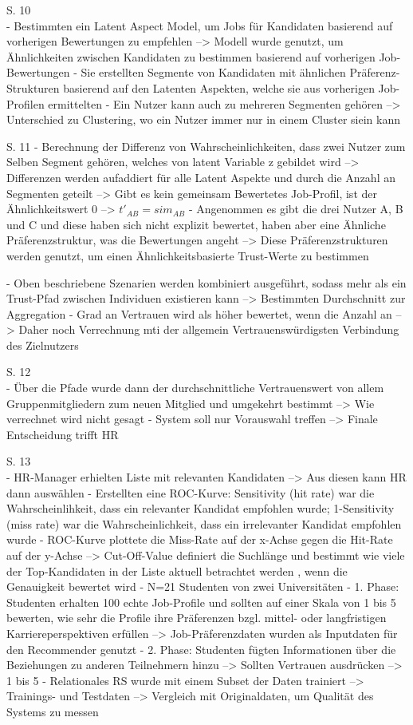 S. 10\\
- Bestimmten ein Latent Aspect Model, um Jobs für Kandidaten basierend auf vorherigen Bewertungen zu empfehlen --> Modell wurde genutzt, um Ähnlichkeiten zwischen Kandidaten zu bestimmen basierend auf vorherigen Job-Bewertungen
- Sie erstellten Segmente von Kandidaten mit ähnlichen Präferenz-Strukturen basierend auf den Latenten Aspekten, welche sie aus vorherigen Job-Profilen ermittelten
- Ein Nutzer kann auch zu mehreren Segmenten gehören --> Unterschied zu Clustering, wo ein Nutzer immer nur in einem Cluster siein kann

S. 11
- Berechnung der Differenz von Wahrscheinlichkeiten, dass zwei Nutzer zum Selben Segment gehören, welches von latent Variable z gebildet wird --> Differenzen werden aufaddiert für alle Latent Aspekte und durch die Anzahl an Segmenten geteilt --> Gibt es kein gemeinsam Bewertetes Job-Profil, ist der Ähnlichkeitswert 0 --> $t'_{AB}=sim_{AB}$
- Angenommen es gibt die drei Nutzer A, B und C und diese haben sich nicht explizit bewertet, haben aber eine Ähnliche Präferenzstruktur, was die Bewertungen angeht --> Diese Präferenzstrukturen werden genutzt, um einen Ähnlichkeitsbasierte Trust-Werte zu bestimmen

- Oben beschriebene Szenarien werden kombiniert ausgeführt, sodass mehr als ein Trust-Pfad zwischen Individuen existieren kann --> Bestimmten Durchschnitt zur Aggregation
- Grad an Vertrauen wird als höher bewertet, wenn die Anzahl an --> Daher noch Verrechnung mti der allgemein Vertrauenswürdigsten Verbindung des Zielnutzers

S. 12\\
- Über die Pfade wurde dann der durchschnittliche Vertrauenswert von allem Gruppenmitgliedern zum neuen Mitglied und umgekehrt bestimmt --> Wie verrechnet wird nicht gesagt
- System soll nur Vorauswahl treffen --> Finale Entscheidung trifft HR

S. 13\\
- HR-Manager erhielten Liste mit relevanten Kandidaten --> Aus diesen kann HR dann auswählen
- Erstellten eine ROC-Kurve: Sensitivity (hit rate) war die Wahrscheinlihkeit, dass ein relevanter Kandidat empfohlen wurde; 1-Sensitivity (miss rate) war die Wahrscheinlichkeit, dass ein irrelevanter Kandidat empfohlen wurde
- ROC-Kurve plottete die Miss-Rate auf der x-Achse gegen die Hit-Rate auf der y-Achse --> Cut-Off-Value definiert die Suchlänge und bestimmt wie viele der Top-Kandidaten in der Liste aktuell betrachtet werden , wenn die Genauigkeit bewertet wird
- N=21 Studenten von zwei Universitäten
- 1. Phase: Studenten erhalten 100 echte Job-Profile und sollten auf einer Skala von 1 bis 5 bewerten, wie sehr die Profile ihre Präferenzen bzgl. mittel- oder langfristigen Karriereperspektiven erfüllen --> Job-Präferenzdaten wurden als Inputdaten für den Recommender genutzt
- 2. Phase: Studenten fügten Informationen über die Beziehungen zu anderen Teilnehmern hinzu --> Sollten Vertrauen ausdrücken --> 1 bis 5
- Relationales RS wurde mit einem Subset der Daten trainiert --> Trainings- und Testdaten --> Vergleich mit Originaldaten, um Qualität des Systems zu messen

